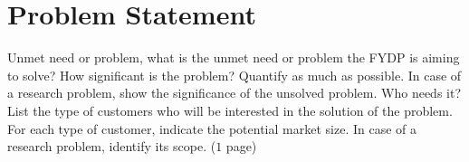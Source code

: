 
\chapter{Problem Statement}
\label{Chapter2}
Unmet need or problem, what is the unmet need or problem the FYDP is aiming to solve? How significant is the problem? Quantify as much as possible. In case of a research problem, show the significance of the unsolved problem. Who needs it? List the type of customers who will be interested in the solution of the problem. For each type of customer, indicate the potential market size. In case of a research problem, identify its scope. ($1$ page)
